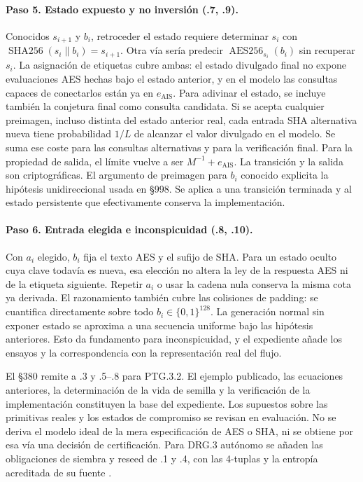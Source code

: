 \documentclass[11pt,a4paper]{article}
\newcommand{\bits}{\{0,1\}}
\newcommand{\AES}{\operatorname{AES256}}
\newcommand{\SHA}{\operatorname{SHA256}}
\begin{document}
\paragraph{Paso 5. Estado expuesto y no inversión (.7, .9).}
Conocidos \(s_{i+1}\) y \(b_i\), retroceder el estado requiere
determinar \(s_i\) con \(\SHA(s_i\|b_i)=s_{i+1}\).
Otra vía sería predecir \(\AES_{s_i}(b_i)\) sin recuperar
\(s_i\). La asignación de etiquetas cubre ambas: el estado
divulgado final no expone evaluaciones AES hechas bajo
el estado anterior, y en el modelo las consultas capaces
de conectarlos están ya en \(e_{\mathrm{AIS}}\).
Para adivinar el estado, se incluye también la conjetura
final como consulta candidata. Si se acepta cualquier
preimagen, incluso distinta del estado anterior real, cada
entrada SHA alternativa nueva tiene probabilidad \(1/L\) de
alcanzar el valor divulgado en el modelo. Se suma ese coste
para las consultas alternativas y para la verificación final.
Para la propiedad de salida,
el límite vuelve a ser \(M^{-1}+e_{\mathrm{AIS}}\).
La transición y la salida son criptográficas. El argumento
de preimagen para \(b_i\) conocido explicita la hipótesis
unidireccional usada en §998. Se aplica a una transición
terminada y al estado persistente que efectivamente conserva
la implementación.

\paragraph{Paso 6. Entrada elegida e inconspicuidad (.8, .10).}
Con \(a_i\) elegido, \(b_i\) fija el texto AES y el sufijo
de SHA. Para un estado oculto cuya clave todavía es nueva,
esa elección no altera la ley de la respuesta AES ni de
la etiqueta siguiente. Repetir \(a_i\) o usar la cadena nula
conserva la misma cota ya derivada. El razonamiento también
cubre las colisiones de padding: se cuantifica directamente
sobre todo \(b_i\in\bits^{128}\). La generación normal sin
exponer estado se aproxima a una secuencia uniforme bajo
las hipótesis anteriores. Esto da fundamento para
inconspicuidad, y el expediente añade los ensayos y la
correspondencia con la representación real del flujo.

El §380 remite a .3 y .5--.8 para PTG.3.2. El ejemplo
publicado, las ecuaciones anteriores, la determinación de
la vida de semilla y la verificación de la implementación
constituyen la base del expediente. Los supuestos sobre las
primitivas reales y los estados de compromiso se revisan en
evaluación. No se deriva el modelo ideal de la mera
especificación de AES o SHA, ni se obtiene por esa vía una
decisión de certificación. Para DRG.3 autónomo se añaden
las obligaciones de siembra y reseed de .1 y .4, con las
4-tuplas y la entropía acreditada de su fuente
\cite[§§93--103, 121--125, 207, 211--214, 380 y 998]{ais}.
\end{document}
